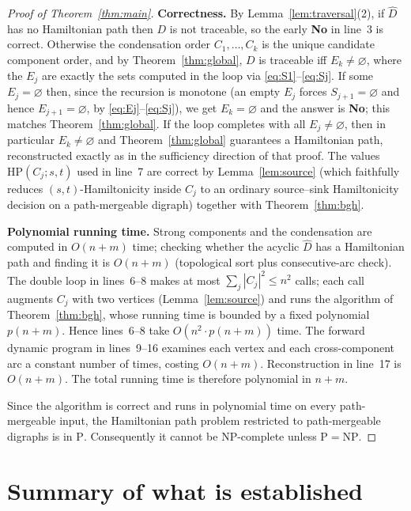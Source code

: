 \documentclass[12pt]{article}
\theoremstyle{definition}
\begin{document}
\begin{proof}[Proof of Theorem~\ref{thm:main}]
\textbf{Correctness.}
By Lemma~\ref{lem:traversal}(2), if $\widehat D$ has no Hamiltonian path then $D$
is not traceable, so the early \textbf{No} in line~3 is correct. Otherwise the
condensation order $C_{1},\dots,C_{k}$ is the unique candidate component order, and
by Theorem~\ref{thm:global}, $D$ is traceable iff $E_{k}\neq\varnothing$, where the
$E_{j}$ are exactly the sets computed in the loop via
\eqref{eq:S1}--\eqref{eq:Sj}. If some $E_{j}=\varnothing$ then, since the recursion
is monotone (an empty $E_{j}$ forces $S_{j+1}=\varnothing$ and hence
$E_{j+1}=\varnothing$, by \eqref{eq:Ej}--\eqref{eq:Sj}), we get $E_{k}=\varnothing$
and the answer is \textbf{No}; this matches Theorem~\ref{thm:global}. If the loop
completes with all $E_{j}\neq\varnothing$, then in particular $E_{k}\neq\varnothing$
and Theorem~\ref{thm:global} guarantees a Hamiltonian path, reconstructed exactly
as in the sufficiency direction of that proof. The values
$\mathrm{HP}(C_{j};s,t)$ used in line~7 are correct by Lemma~\ref{lem:source}
(which faithfully reduces $(s,t)$-Hamiltonicity inside $C_{j}$ to an ordinary
source--sink Hamiltonicity decision on a path-mergeable digraph) together with
Theorem~\ref{thm:bgh}.

\textbf{Polynomial running time.}
Strong components and the condensation are computed in $O(n+m)$ time; checking
whether the acyclic $\widehat D$ has a Hamiltonian path and finding it is $O(n+m)$
(topological sort plus consecutive-arc check). The double loop in lines~6--8 makes
at most $\sum_{j}|C_{j}|^{2}\le n^{2}$ calls; each call augments $C_{j}$ with two
vertices (Lemma~\ref{lem:source}) and runs the algorithm of
Theorem~\ref{thm:bgh}, whose running time is bounded by a fixed polynomial
$p(n+m)$. Hence lines~6--8 take $O(n^{2}\cdot p(n+m))$ time. The forward dynamic
program in lines~9--16 examines each vertex and each cross-component arc a constant
number of times, costing $O(n+m)$. Reconstruction in line~17 is $O(n+m)$. The total
running time is therefore polynomial in $n+m$.

Since the algorithm is correct and runs in polynomial time on every path-mergeable
input, the Hamiltonian path problem restricted to path-mergeable digraphs is in
$\mathrm{P}$. Consequently it cannot be NP-complete unless $\mathrm{P}=\mathrm{NP}$.
\end{proof}

\section*{Summary of what is established}
\end{document}
